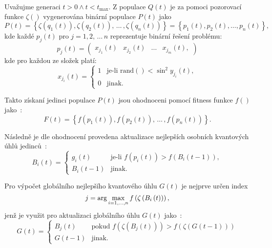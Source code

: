 Uvažujme generaci $t>0 \wedge t<t_{\text{max}}$. Z populace $Q(t)$ je za pomoci pozorovací funkce $\zeta\left(\right)$ vygenerována binární populace $P(t)$ jako
\begin{equation}
    P\left(t\right) = \left\{\zeta\left(q_1\left(t\right)\right), \zeta\left(q_2\left(t\right)\right), \,\dots\, , \zeta\left(q_n\left(t\right)\right) \right\} = \left\{ p_1\left(t\right), p_2\left(t\right), \dots, p_n\left(t\right) \right\},
\end{equation}
kde každé $p_j(t)$ pro $j=1,2,\,\dots\,n$ reprezentuje binární řešení problému:
\begin{equation*}
    p_j(t) = 
    \begin{pmatrix}
        x_{j_1}(t) & x_{j_2}(t) & \dots & x_{j_m}(t),
    \end{pmatrix}
\end{equation*}
kde pro každou ze složek platí:
\begin{equation*}
    x_{j_i}\left(t\right) =
    \begin{cases}
      1 & \text{je-li } \mathrm{rand}()<\sin^2 y_{j_i}\left(t\right),\\
      0 & \text{jinak.}
    \end{cases}
\end{equation*}

Takto získaní jedinci populace $P(t)$ jsou ohodnoceni pomocí fitness funkce $f\left(\right)$ jako~\cite{qse}: 
\begin{equation*}
    F\left(t\right) = \left\{ f\left(p_1\left(t\right)\right), f\left(p_2\left(t\right)\right), \,\dots\,, f\left(p_n\left(t\right)\right) \right\}.
\end{equation*}

Následně je dle ohodnocení provedena aktualizace nejlepších osobních kvantových úhlů jedinců~\cite{qse}:
\begin{equation*}
    B_i\left(t\right) =
    \begin{cases}
        g_i\left(t\right)   & \text{je-li } f\left(p_i\left(t\right)\right) > f\left(B_i\left(t-1\right)\right), \\
        B_i\left(t-1\right) & \text{jinak.}
    \end{cases}
\end{equation*}

Pro výpočet globálního nejlepšího kvantového úhlu $G\left(t\right)$ je nejprve určen index
\begin{equation*}
    j = \arg\max_{i=1,\dots,n} f\left(\zeta\left(B_i\left(t\right)\right)\right),\\[5pt]
\end{equation*}
jenž je využit pro aktualizaci globálního úhlu $G\left(t\right)$ jako~\cite{qse}:
\begin{equation*}
    G(t) =
    \begin{cases}
        B_j\left(t\right)   & \text{pokud } f\left(\zeta\left(B_j\left(t\right)\right)\right) > f\left(\zeta\left(G\left(t-1\right)\right)\right) \\
        G\left(t-1\right)   & \text{jinak.}
    \end{cases}
\end{equation*}

